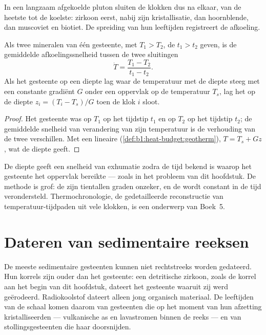In een langzaam afgekoelde pluton sluiten de klokken dus na elkaar, van de heetste tot de koelste: zirkoon eerst, nabij zijn kristallisatie, dan hoornblende, dan muscoviet en biotiet. De spreiding van hun leeftijden registreert de afkoeling.

\begin{proposition}\label{prop:b1:radiometric-methods:cooling}
Als twee mineralen van één gesteente, met  $T_1 > T_2$, de  $t_1 > t_2$ geven, is de gemiddelde afkoelingssnelheid tussen de twee sluitingen
\[
  \dot T = \frac{T_1 - T_2}{t_1 - t_2}.
\]
Als het gesteente op een diepte lag waar de temperatuur met de diepte steeg met een constante gradiënt $G$ onder een oppervlak op de temperatuur $T_s$, lag het op de diepte $z_i
= (T_i - T_s)/G$ toen de klok $i$ sloot.
\end{proposition}

\begin{proof}
Het gesteente was op $T_1$ op het tijdstip $t_1$ en op $T_2$ op het tijdstip $t_2$; de gemiddelde snelheid van verandering van zijn temperatuur is de verhouding van de twee verschillen. Met een lineaire  (\cref{def:b1:heat-budget:geotherm}), $T = T_s + G z$, wat de diepte geeft.
\end{proof}

De diepte geeft een snelheid van exhumatie zodra de tijd bekend is waarop het gesteente het oppervlak bereikte --- zoals in het probleem van dit hoofdstuk. De methode is grof: de  zijn tientallen graden onzeker, en de  wordt constant in de tijd verondersteld. Thermochronologie, de gedetailleerde reconstructie van temperatuur-tijdpaden uit vele klokken, is een onderwerp van Boek~5.

\section{Dateren van sedimentaire reeksen}\label{sec:b1:radiometric-methods:sediments}

De meeste sedimentaire gesteenten kunnen niet rechtstreeks worden gedateerd. Hun korrels zijn ouder dan het gesteente: een detritische zirkoon, zoals de korrel aan het begin van dit hoofdstuk, dateert het gesteente waaruit zij werd geërodeerd. Radiokoolstof dateert alleen jong organisch materiaal. De leeftijden van de schaal komen daarom van gesteenten die op het moment van hun afzetting kristalliseerden --- vulkanische as en lavastromen binnen de reeks --- en van stollingsgesteenten die haar doorsnijden.

